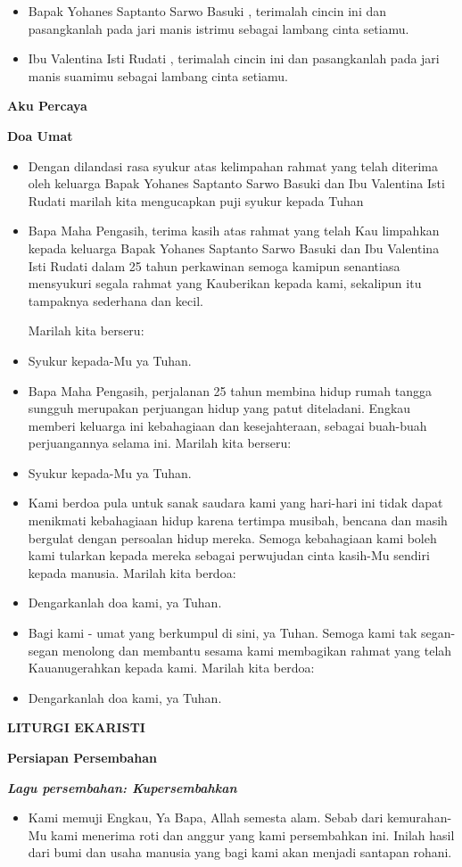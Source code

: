 \documentclass[12pt,two pages]{scrbook}
\makeatletter
\newcommand{\judul}[1]{%
  {\parindent \z@ \centering \normalfont
    \interlinepenalty\@M \Large \bfseries #1\par\nobreak \vskip 20\p@ }}
\newcommand{\subjudul}[1]{%
  {\parindent \z@ \normalfont
    \interlinepenalty\@M \bfseries #1\par\nobreak \vskip 20\p@ }}
\newcommand{\lagu}[1]{%
  {\parindent \z@ \normalfont
    \interlinepenalty\@M \bfseries \emph{#1}\par\nobreak \vskip 20\p@ }}
\newcommand{\BU}[1]{\begin{itemize} \item[U:] #1 \end{itemize}}
\newcommand{\BI}[1]{\begin{itemize} \item[I:] #1 \end{itemize}}
\newcommand{\BP}[1]{\begin{itemize} \item[P:] #1 \end{itemize}}
\newcommand{\ultah}{25 }
\newcommand{\suami}{Yohanes Saptanto Sarwo Basuki }
\newcommand{\istri}{Valentina Isti Rudati }
\makeatother
\begin{document}
\BI{Bapak \suami, terimalah cincin ini dan pasangkanlah pada jari manis istrimu sebagai lambang cinta setiamu.}

\BI{Ibu \istri, terimalah cincin ini dan pasangkanlah pada jari manis suamimu sebagai lambang cinta setiamu.}

\subjudul{Aku Percaya}

\subjudul{Doa Umat}

\BI{Dengan dilandasi rasa syukur atas kelimpahan rahmat yang telah diterima oleh keluarga Bapak \suami dan Ibu \istri marilah kita mengucapkan puji syukur kepada Tuhan}

\BP{Bapa Maha Pengasih, terima kasih atas rahmat yang telah Kau limpahkan kepada keluarga Bapak \suami dan Ibu \istri 
dalam \ultah tahun perkawinan semoga kamipun senantiasa mensyukuri segala rahmat yang Kauberikan kepada kami, sekalipun itu tampaknya sederhana dan kecil.

Marilah kita berseru:}

\BU{Syukur kepada-Mu ya Tuhan.}

\BP{Bapa Maha Pengasih, perjalanan \ultah tahun membina hidup rumah tangga sungguh merupakan perjuangan hidup yang patut diteladani. Engkau memberi keluarga ini kebahagiaan dan kesejahteraan, sebagai buah-buah perjuangannya selama ini. Marilah kita berseru:}

\BU{Syukur kepada-Mu ya Tuhan.}

\BP{Kami berdoa pula untuk sanak saudara kami yang hari-hari ini tidak dapat menikmati kebahagiaan hidup karena tertimpa musibah, bencana dan masih bergulat dengan persoalan hidup mereka. Semoga kebahagiaan kami boleh kami tularkan kepada mereka sebagai perwujudan cinta kasih-Mu sendiri kepada manusia. Marilah kita berdoa:}

\BU{Dengarkanlah doa kami, ya Tuhan.}

\BP{Bagi kami - umat yang berkumpul di sini, ya Tuhan. Semoga kami tak segan-segan menolong dan membantu sesama kami membagikan rahmat yang telah Kauanugerahkan kepada kami. Marilah kita berdoa:}

\BU{Dengarkanlah doa kami, ya Tuhan.}

\judul{LITURGI EKARISTI}

\subjudul{Persiapan Persembahan}

\lagu{Lagu persembahan: Kupersembahkan}

\BI{Kami memuji Engkau, Ya Bapa, Allah semesta alam. Sebab dari kemurahan-Mu kami menerima roti dan anggur yang kami persembahkan ini. Inilah hasil dari bumi dan usaha manusia yang bagi kami akan menjadi santapan rohani.}
\end{document}
